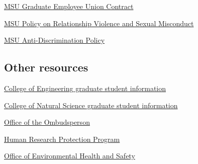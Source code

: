 \vspace{2mm}
\noindent
\href{https://www.hr.msu.edu/contracts/documents/GEU2015-2019.pdf}{MSU Graduate Employee Union Contract}

\vspace{2mm}
\noindent
\href{http://www.hr.msu.edu/documents/uwidepolproc/RVSM_Policy.htm}{MSU Policy on Relationship Violence and Sexual Misconduct}


\vspace{2mm}
\noindent
\href{https://www.hr.msu.edu/policies-procedures/university-wide/ADP_policy.html}{MSU Anti-Discrimination Policy}



\vspace{2mm}
\subsection{Other resources}
\label{sec:resources_other}

\vspace{2mm}
\noindent
\href{https://www.egr.msu.edu/graduate/current-students}{College
  of Engineering graduate student information}

\vspace{2mm}
\noindent
\href{https://natsci.msu.edu/students/current-students/}{College of Natural Science graduate student information}


\vspace{2mm}
\noindent
\href{https://ombud.msu.edu/}{Office of the Ombudsperson}

\vspace{2mm}
\noindent
\href{http://hrpp.msu.edu/}{Human Research Protection Program}


\vspace{2mm}
\noindent
\href{http://www.ehs.msu.edu}{Office of Environmental Health and
  Safety }
